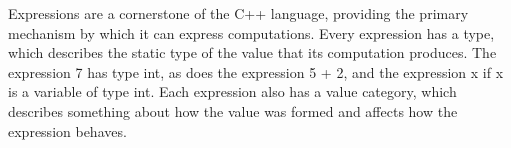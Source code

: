 Expressions are a cornerstone of the C++ language, providing the primary mechanism by which it can express computations. Every expression has a type, which describes the static type of the value that its computation produces. The expression 7 has type int, as does the expression 5 + 2, and the expression x if x is a variable of type int. Each expression also has a value category, which describes something about how the value was formed and affects how the expression behaves.
